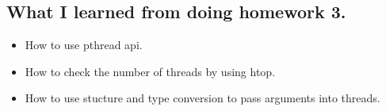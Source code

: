\documentclass[12pt, a4paper]{article}
\begin{document}
\begin{CJK*}{UTF8}{bsmi}
    \section{What I learned from doing homework 3.}
        \begin{itemize}
        \item How to use pthread api.
        \item How to check the number of threads by using htop.
        \item How to use stucture and type conversion to pass arguments into threads.
        \end{itemize}

    \end{CJK*}
\end{document}
